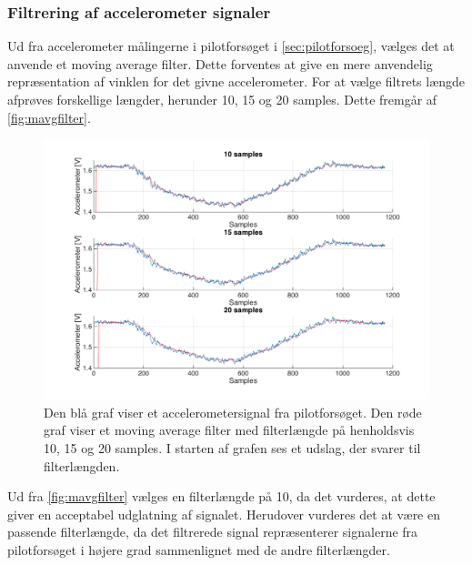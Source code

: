 \subsubsection{Filtrering af accelerometer signaler} \label{sec:mavg_krav}
Ud fra accelerometer målingerne i pilotforsøget i \autoref{sec:pilotforsoeg}, vælges det at anvende et moving average filter. 
Dette forventes at give en mere anvendelig repræsentation af vinklen for det givne accelerometer. 
For at vælge filtrets længde afprøves forskellige længder, herunder 10, 15 og 20 samples. Dette fremgår af \autoref{fig:mavgfilter}.


\begin{figure} [H]
\centering
\includegraphics[width=1\textwidth]{figures/problemloesning/mavgfilter_matlab} 
\caption{Den blå graf viser et accelerometersignal fra pilotforsøget. Den røde graf viser et moving average filter med filterlængde på henholdsvis 10, 15 og 20 samples. I starten af grafen ses et udslag, der  svarer til filterlængden.}
\label{fig:mavgfilter}
\end{figure}

\noindent
Ud fra \autoref{fig:mavgfilter} vælges en filterlængde på 10, da det vurderes, at dette giver en acceptabel udglatning af signalet.
Herudover vurderes det at være en passende filterlængde, da det filtrerede signal repræsenterer signalerne fra pilotforsøget i højere grad sammenlignet med de andre filterlængder. 


